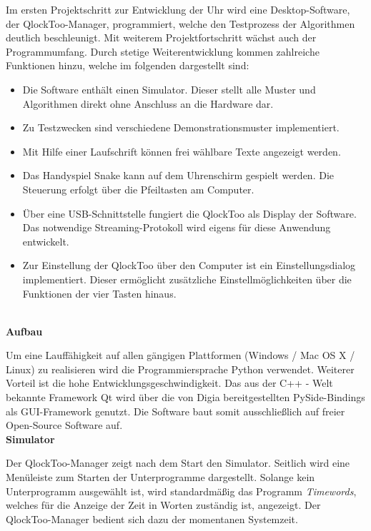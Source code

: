 \begin{multicols}{2}
Im ersten Projektschritt zur Entwicklung der Uhr wird eine Desktop-Software, der QlockToo-Manager, programmiert, welche den Testprozess der Algorithmen deutlich beschleunigt. Mit weiterem Projektfortschritt wächst auch der Programmumfang. Durch stetige Weiterentwicklung kommen zahlreiche Funktionen hinzu, welche im folgenden dargestellt sind:

\begin{itemize}

\item Die Software enthält einen Simulator. Dieser stellt alle Muster und Algorithmen direkt ohne Anschluss an die Hardware dar.
\item Zu Testzwecken sind verschiedene Demonstrationsmuster implementiert.
\item Mit Hilfe einer Laufschrift können frei wählbare Texte angezeigt werden.
\item Das Handyspiel Snake kann auf dem Uhrenschirm gespielt werden. Die Steuerung erfolgt über die Pfeiltasten am Computer.
\item Über eine USB-Schnittstelle fungiert die QlockToo als Display der Software. Das notwendige Streaming-Protokoll wird eigens für diese Anwendung entwickelt.
\item Zur Einstellung der QlockToo über den Computer ist ein Einstellungsdialog implementiert. Dieser ermöglicht zusätzliche Einstellmöglichkeiten über die Funktionen der vier Tasten hinaus.
\end{itemize}
\ \\
\textbf{Aufbau}

Um eine Lauffähigkeit auf allen gängigen Plattformen (Windows / Mac OS X / Linux) zu realisieren wird die Programmiersprache Python verwendet. Weiterer Vorteil ist die hohe Entwicklungsgeschwindigkeit.
Das aus der C++ - Welt bekannte Framework Qt wird über die von Digia bereitgestellten PySide-Bindings als GUI-Framework genutzt. Die Software baut somit ausschließlich auf freier Open-Source Software auf.
\ \\

\textbf{Simulator}

Der QlockToo-Manager zeigt nach dem Start den Simulator. Seitlich wird eine Menüleiste zum Starten der Unterprogramme dargestellt.
Solange kein Unterprogramm ausgewählt ist, wird standardmäßig das Programm \emph{Timewords}, welches für die Anzeige der Zeit in Worten zuständig ist, angezeigt. Der QlockToo-Manager bedient sich dazu der momentanen Systemzeit.


\end{multicols}
